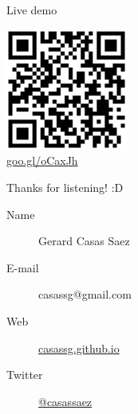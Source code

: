 \documentclass[10pt, compress]{beamer}
\begin{document}
\begin{frame}{Live demo}
  \begin{center}

    \includegraphics[width=0.3\textwidth]{images/qr.png}\\
      \href{http://fmeconnect.s3-website.eu-central-1.amazonaws.com}{\url{goo.gl/oCaxJh}}
  \end{center}

  

\end{frame}




\begin{frame}
    \huge Thanks for listening! :D \\
    
    \normalsize
  \begin{description}
   \item[Name] Gerard Casas Saez
    \item[E-mail] casassg@gmail.com
    \item[Web] \href{casassg.github.io}{casassg.github.io}
    \item[Twitter] \href{twitter.com/casassaez}{@casassaez}
  \end{description}
\end{frame}
\end{document}
